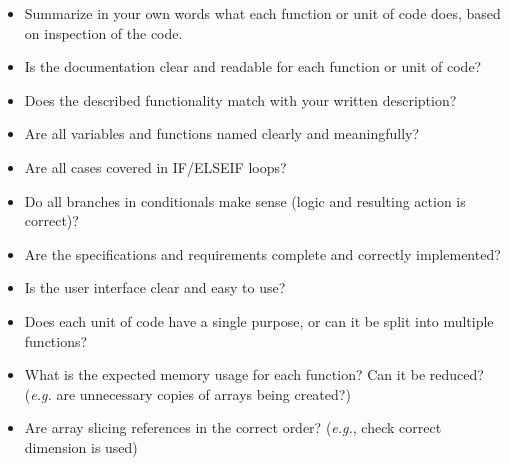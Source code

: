 \documentclass[12pt, titlepage]{article}
\begin{document}
\begin{itemize}
\item Summarize in your own words what each function or unit of code does, based on inspection of the code. 
\item Is the documentation clear and readable for each function or unit of code?
\item Does the described functionality match with your written description?
\item Are all variables and functions named clearly and meaningfully?
\item Are all cases covered in IF/ELSEIF loops?
\item Do all branches in conditionals make sense (logic and resulting action is correct)?
\item Are the specifications and requirements complete and correctly implemented?
\item Is the user interface clear and easy to use?
\item Does each unit of code have a single purpose, or can it be split into multiple functions?
\item What is the expected memory usage for each function? Can it be reduced? (\textit{e.g.} are unnecessary copies of arrays being created?)
\item Are array slicing references in the correct order? (\textit{e.g.}, check correct dimension is used)
\end{itemize}
\end{document}
